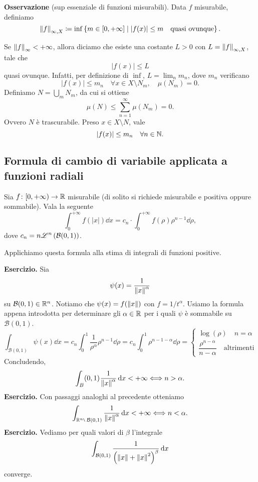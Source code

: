 \documentclass[a4paper, 12pt]{report}
\begin{document}
\textbf{Osservazione} (sup essenziale di funzioni misurabili).
Data $f$ misurabile, definiamo
$$
	\left\lVert  f  \right\rVert_{\infty, X} \coloneqq \inf \left\{ m \in [0,+\infty] \;\middle|\; \left| f(x) \right| \leq m \quad \text{quasi ovunque}  \right\}.
$$

Se $\left\lVert  f  \right\rVert_{\infty} < + \infty$, allora diciamo che esiste una costante $L > 0$ con $L = \left\lVert  f  \right\rVert_{\infty, X}$, tale che 
$$
	\left| f(x) \right| \leq L
$$
quasi ovunque. 
Infatti, per definizione di $\inf$, $L = \lim_n m_n$, dove $m_n$ verificano
$$
	\left| f(x) \right| \leq m_n \quad \forall x \in X \setminus N_m, \quad \mu(N_m) = 0.
$$
Definiamo $N = \bigcup_{m} N_m$, da cui si ottiene
$$
	\mu(N) \leq \sum_{n=1}^{\infty} \mu (N_m) = 0. 
$$
Ovvero $N$ è trascurabile.
Preso $x \in X \setminus N$, vale
$$
	\left| f(x) \right| \leq m_n \quad \forall n \in \mathbb N.
$$


\subsection*{Formula di cambio di variabile applicata a funzioni radiali}

Sia $f \colon [0,+\infty) \to \mathbb R$ misurabile (di solito si richiede misurabile e positiva oppure sommabile).
Vala la seguente
$$
	\int_{0}^{+\infty} f\left( \left| x \right| \right) \dd x = c_n \cdot \int_{0}^{+\infty} f(\rho) \rho^{n-1} \dd \rho,
$$
dove $\displaystyle c_n = n \mathscr L^n \left( \mathcal{B}(0,1) \right)$.

Applichiamo questa formula alla stima di integrali di funzioni positive.

\textbf{Esercizio.}
Sia
$$
	\psi (x) = \frac{1}{\left\lVert  x  \right\rVert^{\alpha}}
$$
su $\mathcal{B}(0,1) \in \mathbb R^n$. Notiamo che $\psi(x) = f(\left\lVert  x  \right\rVert)$ con $f = 1 / t^\alpha$.
Usiamo la formula appena introdotta per determinare gli $\alpha \in \mathbb R$ per i quali $\psi$ è sommabile su $\mathcal{B}(0,1)$.
%
$$
\int_{\mathcal{B(0,1)}}^{} \psi(x) \dd x 
= c_n \int_0^1 \frac{1}{\rho^\alpha} \rho^{n -1} \dd \rho 
= c_n \int_0^1 \rho^{n-1-\alpha} \dd \rho =
\begin{cases}
	\log (\rho) \quad n = \alpha \\
	\dfrac{\rho^{n-\alpha}}{n - \alpha} \quad \text{altrimenti} 
\end{cases} 
$$
%
Concludendo,
%
$$
	\int_{B}(0,1)^{} \frac{1}{\left\lVert  x  \right\rVert^\alpha} \,\mathrm{d} x < + \infty \Longleftrightarrow n > \alpha.
$$
%
\textbf{Esercizio.}
Con passaggi analoghi al precedente otteniamo
%
$$
	\int_{\R^n \setminus \; \mathcal{B}(0,1)} \frac{1}{\norm{ x }^\alpha} \dd x < + \infty \longiff n < \alpha.
$$
%
\textbf{Esercizio.}
Vediamo per quali valori di $\beta$ l'integrale
%
$$
	\int_{\mathcal{B}(0,1)}^{} \frac{1}{\left( \left\lVert  x  \right\rVert + \left\lVert  x  \right\rVert^2 \right)^\beta} \,\mathrm{d} x
$$
%
converge.
\end{document}
